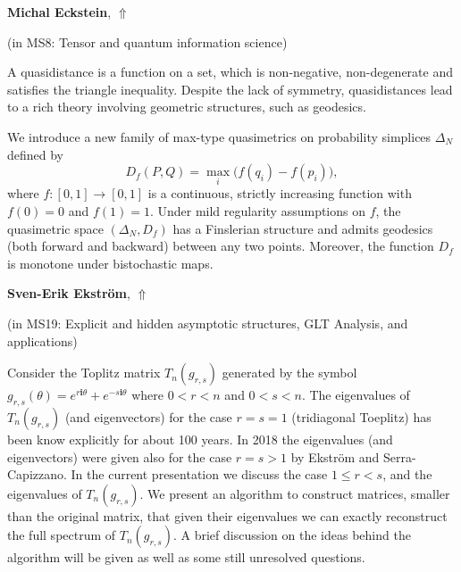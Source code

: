 \documentclass[ILAS2025-program.tex]{subfiles}
\begin{document}
\hypertarget{down0052}{}\begin{ilasabstract}
    
\textbf{Michal Eckstein},  \hfill \hyperlink{up0052}{$\Uparrow$}
    
    
(in {\color{mstitle}MS8: Tensor and quantum information science})
        
\mtskip
    A quasidistance is a function on a set, which is non-negative, non-degenerate and satisfies the triangle inequality. Despite the lack of symmetry, quasidistances lead to a rich theory involving geometric structures, such as geodesics. 

We introduce a new family of max-type quasimetrics on probability simplices $\Delta_N$ defined by
\[
D_f(P,Q) = \max_i \big( f(q_i) - f(p_i) \big),
\]
where \(f\colon [0,1]\to [0,1]\) is a continuous, strictly increasing function with \(f(0)=0\) and \(f(1)=1\). Under mild regularity assumptions on \(f\), the quasimetric space $(\Delta_N,D_f)$ has a Finslerian structure and admits geodesics (both forward and backward) between any two points. Moreover, the function \(D_f\) is monotone under bistochastic maps.

\end{ilasabstract}
    

\hypertarget{down0258}{}\begin{ilasabstract}
    
\textbf{Sven-Erik Ekström},  \hfill \hyperlink{up0258}{$\Uparrow$}
    
    
(in {\color{mstitle}MS19: Explicit and hidden asymptotic structures, GLT Analysis, and applications})
        
\mtskip
    Consider the Toplitz matrix $T_n(g_{r,s})$ generated by the symbol $g_{r,s}(\theta)=e^{r\mathbf{i}\theta}+e^{-s\mathbf{i}\theta}$ where $0<r<n$ and $0<s<n$.
The eigenvalues of $T_n(g_{r,s})$ (and eigenvectors) for the case $r=s=1$ (tridiagonal Toeplitz) has been know explicitly for about 100 years. In 2018 the eigenvalues (and eigenvectors) were given also for the case $r=s>1$ by Ekström and Serra-Capizzano.
In the current presentation we discuss the case $1\leq r<s$, and the eigenvalues of $T_n(g_{r,s})$.  
We present an algorithm to construct matrices, smaller than the original matrix, that given their eigenvalues we can exactly reconstruct the full spectrum of $T_n(g_{r,s})$. A brief discussion on the ideas behind the algorithm will be given as well as some still unresolved questions. 

\end{ilasabstract}
    
\end{document}
